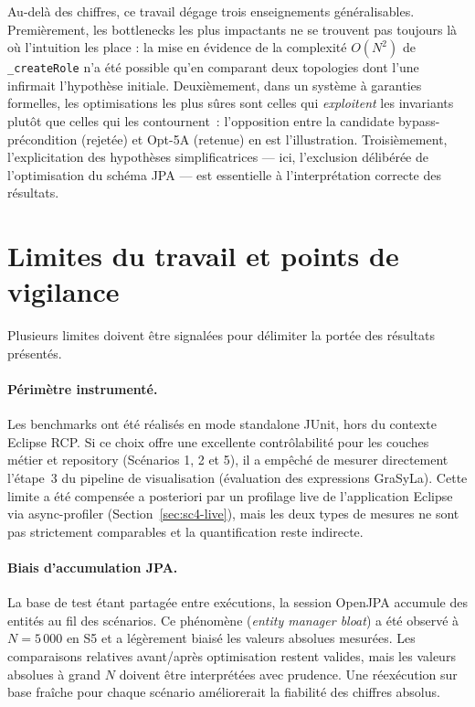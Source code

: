 Au-delà des chiffres, ce travail dégage trois enseignements généralisables.
Premièrement, les bottlenecks les plus impactants ne se trouvent pas
toujours là où l'intuition les place : la mise en évidence de la complexité
$O(N^2)$ de \texttt{\_createRole} n'a été possible qu'en comparant deux
topologies dont l'une infirmait l'hypothèse initiale. Deuxièmement, dans
un système à garanties formelles, les optimisations les plus sûres sont celles
qui \emph{exploitent} les invariants plutôt que celles qui les contournent~:
l'opposition entre la candidate \og bypass-précondition \fg{} (rejetée) et
Opt-5A (retenue) en est l'illustration.
Troisièmement, l'explicitation des hypothèses simplificatrices — ici,
l'exclusion délibérée de l'optimisation du schéma JPA — est essentielle à
l'interprétation correcte des résultats.

\section{Limites du travail et points de vigilance}

Plusieurs limites doivent être signalées pour délimiter la portée des résultats présentés.

\paragraph{Périmètre instrumenté.}
Les benchmarks ont été réalisés en mode standalone JUnit, hors du contexte
Eclipse RCP. Si ce choix offre une excellente contrôlabilité pour les couches
métier et repository (Scénarios 1, 2 et 5), il a empêché de mesurer
directement l'étape~3 du pipeline de visualisation (évaluation des expressions
GraSyLa). Cette limite a été compensée a posteriori par un profilage live de
l'application Eclipse via async-profiler (Section~\ref{sec:sc4-live}), mais
les deux types de mesures ne sont pas strictement comparables et la
quantification reste indirecte.

\paragraph{Biais d'accumulation JPA.}
La base de test étant partagée entre exécutions, la session OpenJPA accumule
des entités au fil des scénarios. Ce phénomène (\emph{entity manager bloat}) a
été observé à $N = 5\,000$ en S5 et a légèrement biaisé les valeurs absolues
mesurées. Les comparaisons relatives avant/après optimisation restent valides,
mais les valeurs absolues à grand $N$ doivent être interprétées avec
prudence. Une réexécution sur base fraîche pour chaque scénario améliorerait
la fiabilité des chiffres absolus.


